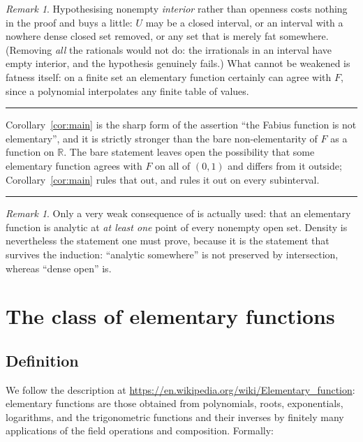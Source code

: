 \documentclass[11pt,oneside]{article}
\theoremstyle{definition}
\theoremstyle{remark}
\newtheorem{remark}[theorem]{Remark}
\newcommand{\R}{\mathbb R}
\newenvironment{boxedremark}{%
  \par\smallskip\noindent\begin{center}\begin{minipage}{0.94\textwidth}%
  \color{black}\hrule\vspace{0.6em}\small
}{%
  \vspace{0.6em}\hrule\end{minipage}\end{center}\smallskip
}
\begin{document}
\begin{remark}
Hypothesising nonempty \emph{interior} rather than openness costs nothing in
the proof and buys a little: $U$ may be a closed interval, or an interval with
a nowhere dense closed set removed, or any set that is merely fat somewhere.
(Removing \emph{all} the rationals would not do: the irrationals in an
interval have empty interior, and the hypothesis genuinely fails.)
What cannot be weakened is fatness itself: on a finite set an elementary
function certainly can agree with $F$, since a polynomial interpolates any
finite table of values.
\end{remark}

\begin{boxedremark}
Corollary~\ref{cor:main} is the sharp form of the assertion ``the Fabius function is
not elementary'', and it is strictly stronger than the bare
non-elementarity of $F$ as a function on $\R$.  The bare statement leaves
open the possibility that some elementary function agrees with $F$ on all of
$(0,1)$ and differs from it outside; Corollary~\ref{cor:main} rules that out, and rules
it out on every subinterval.
\end{boxedremark}

\begin{remark}
Only a very weak consequence of  is actually used: that an
elementary function is analytic at \emph{at least one} point of every nonempty
open set.  Density is nevertheless the statement one must prove, because it is
the statement that survives the induction: ``analytic somewhere'' is not
preserved by intersection, whereas ``dense open'' is.
\end{remark}

\section{The class of elementary functions}\label{sec:elem}

\subsection{Definition}

We follow the description at
\url{https://en.wikipedia.org/wiki/Elementary_function}: elementary functions
are those obtained from polynomials, roots, exponentials, logarithms, and the
trigonometric functions and their inverses by finitely many applications of
the field operations and composition.  Formally:
\end{document}
